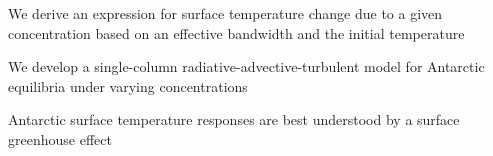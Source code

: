 \documentclass[draft]{agujournal2019}
\begin{document}



\begin{keypoints}
\item We derive an expression for surface temperature change due to a given  concentration based on an effective bandwidth and the initial temperature
\item We develop a single-column radiative-advective-turbulent model for Antarctic equilibria under varying  concentrations 
\item Antarctic surface temperature responses are best understood by a surface greenhouse effect
\end{keypoints}

%
%

%
%

\end{document}

